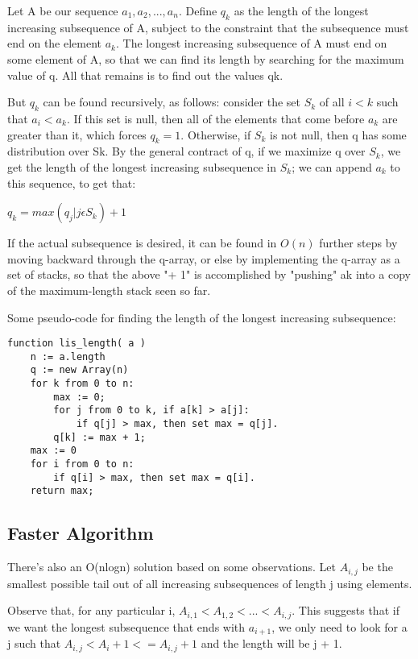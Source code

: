 \documentclass[a4paper, 11pt, oneside]{report}
\begin{document}
Let A be our sequence $a_{1}, a_{2}, ..., a_{n}$. Define $q_{k}$ as the length of the longest increasing subsequence of A, subject to the constraint that the subsequence must end on the element $a_{k}$. The longest increasing subsequence of A must end on some element of A, so that we can find its length by searching for the maximum value of q. All that remains is to find out the values qk.

But $q_{k}$ can be found recursively, as follows: consider the set $S_{k}$ of all $i < k$ such that $a_{i} < a_{k}$. If this set is null, then all of the elements that come before $a_{k}$ are greater than it, which forces $q_{k} = 1$. Otherwise, if $S_{k}$ is not null, then q has some distribution over Sk. By the general contract of q, if we maximize q over $S_{k}$, we get the length of the longest increasing subsequence in $S_{k}$; we can append $a_{k}$ to this sequence, to get that:

$q_{k} = max(q_{j}|j \epsilon S_{k}) + 1$

If the actual subsequence is desired, it can be found in $O(n)$ further steps by moving backward through the q-array, or else by implementing the q-array as a set of stacks, so that the above "+ 1" is accomplished by "pushing" ak into a copy of the maximum-length stack seen so far.

Some pseudo-code for finding the length of the longest increasing subsequence:

\begin{verbatim}
function lis_length( a )
    n := a.length
    q := new Array(n)
    for k from 0 to n:
        max := 0;
        for j from 0 to k, if a[k] > a[j]:
            if q[j] > max, then set max = q[j].
        q[k] := max + 1;
    max := 0
    for i from 0 to n:
        if q[i] > max, then set max = q[i].
    return max;
\end{verbatim}

\subsection*{Faster Algorithm}

There's also an O(nlogn) solution based on some observations. Let $A_{i,j}$ be the smallest possible tail out of all increasing subsequences of length j using elements.

Observe that, for any particular i, $A_{i,1} < A_{1,2} < ... < A_{i,j}$. This suggests that if we want the longest subsequence that ends with $a_{i + 1}$, we only need to look for a j such that $A_{i,j} < A_{i} + 1 <= A_{i,j} + 1$ and the length will be j + 1.
\end{document}
